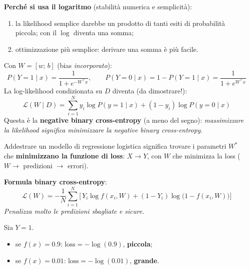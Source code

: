\documentclass[11pt,a4paper]{article}
\begin{document}
\textbf{Perché si usa il logaritmo} (stabilità numerica e semplicità):
\begin{enumerate}
  \item la likelihood semplice darebbe un prodotto di tanti esiti di probabilità piccola; con il $\log$ diventa una somma;
  \item ottimizzazione più semplice: derivare una somma è più facile.
\end{enumerate}

Con $W=[w;\,b]$ (bias \emph{incorporato}):
\[
P(Y=1\mid x) = \frac{1}{1+e^{-W^\top x}}, \qquad
P(Y=0\mid x) = 1-P(Y=1\mid x) = \frac{1}{1+e^{W^\top x}}
\]
La log-likelihood condizionata su $D$ diventa (da dimostrare!):
\[
\mathcal{L}(W\mid D) = \sum_{i=1}^{N} y_i \log P(y=1\mid x) + (1-y_i)\log P(y=0\mid x)
\]
Questa è la \textbf{negative binary cross-entropy} (a meno del segno): \emph{massimizzare la likelihood significa minimizzare la negative binary cross-entropy}.

\begin{importante}[Quindi]
Addestrare un modello di regressione logistica significa trovare i parametri $W^*$ che \textbf{minimizzano la funzione di loss}: $X \to Y$, con $W$ che minimizza la loss ($W \to$ predizioni $\to$ errori).
\end{importante}

\textbf{Formula binary cross-entropy}:
\[
\mathcal{L}(W) = -\frac{1}{N}\sum_{i=1}^{N}\Big[\,Y_i \log f(x_i,W) + (1-Y_i)\log\big(1-f(x_i,W)\big)\Big]
\]
\emph{Penalizza molto le predizioni sbagliate e sicure.}

\begin{center}
\end{center}

\begin{osservazione}[Esempio]
Sia $Y=1$.
\begin{itemize}
  \item se $f(x)=0.9$: $\text{loss} = -\log(0.9)$, \textbf{piccola};
  \item se $f(x)=0.01$: $\text{loss} = -\log(0.01)$, \textbf{grande}.
\end{itemize}
\end{osservazione}
\end{document}
